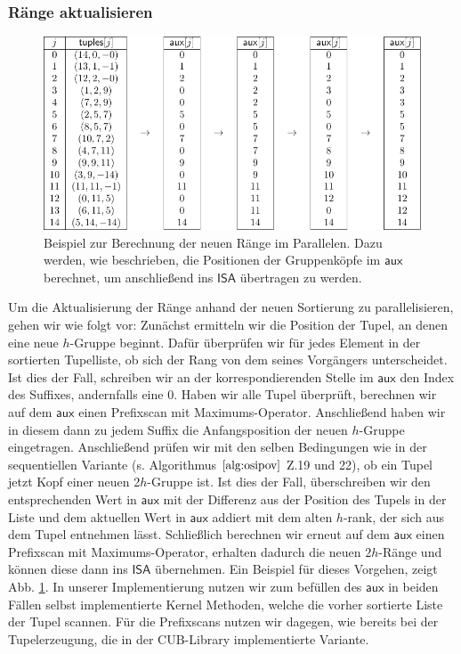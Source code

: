 \subsubsection{Ränge aktualisieren}
\begin{figure}
\includegraphics[scale=0.9]{kapitel/saca_algorithmen/osipov/update_ranks_example.pdf}
\caption{Beispiel zur Berechnung der neuen Ränge im Parallelen. Dazu werden, wie beschrieben, die Positionen der Gruppenköpfe im $\mathsf{aux}$ berechnet, um anschließend ins $\mathsf{ISA}$ übertragen zu werden.}
\label{osipov:update}
\end{figure}
Um die Aktualisierung der Ränge anhand der neuen Sortierung zu parallelisieren, gehen wir wie folgt vor:
Zunächst ermitteln wir die Position der Tupel, an denen eine neue $h$-Gruppe beginnt. Dafür überprüfen wir für jedes Element in der sortierten Tupelliste, ob sich der Rang von dem seines Vorgängers unterscheidet. Ist dies der Fall, schreiben wir an der korrespondierenden Stelle im $\mathsf{aux}$ den Index des Suffixes, andernfalls eine 0. Haben wir alle Tupel überprüft, berechnen wir auf dem $\mathsf{aux}$ einen Prefixscan mit Maximums-Operator. Anschließend haben wir in diesem dann zu jedem Suffix die Anfangsposition der neuen $h$-Gruppe eingetragen. 
Anschließend prüfen wir mit den selben Bedingungen wie in der sequentiellen Variante (s. Algorithmus $\ref{alg:osipov}$ Z.19 und 22), ob ein Tupel jetzt Kopf einer neuen 2$h$-Gruppe ist. Ist dies der Fall, überschreiben wir den entsprechenden Wert in $\mathsf{aux}$ mit der Differenz aus der Position des Tupels in der Liste und dem aktuellen Wert in $\mathsf{aux}$ addiert mit dem alten $h$-rank, der sich aus dem Tupel entnehmen lässt. Schließlich berechnen wir erneut auf dem $\mathsf{aux}$ einen Prefixscan mit Maximums-Operator, erhalten dadurch die neuen $2h$-Ränge und können diese dann ins $\mathsf{ISA}$ übernehmen. Ein Beispiel für dieses Vorgehen, zeigt Abb. \ref{osipov:update}.
In unserer Implementierung nutzen wir zum befüllen des $\mathsf{aux}$ in beiden Fällen selbst implementierte Kernel Methoden, welche die vorher sortierte Liste der Tupel scannen. Für die Prefixscans nutzen wir dagegen, wie bereits bei der Tupelerzeugung, die in der CUB-Library implementierte Variante.
